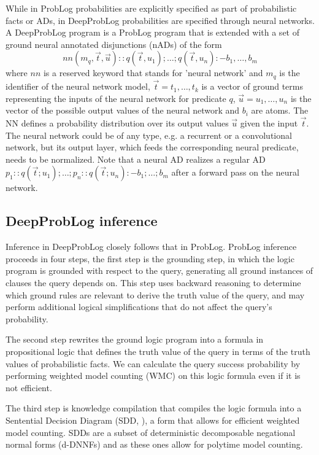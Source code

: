 While in ProbLog probabilities are explicitly specified as part of probabilistic facts or ADs, in DeepProbLog probabilities are specified through neural networks.
A DeepProbLog program is a ProbLog program that is extended with a set of ground neural annotated disjunctions (nADs) of the form
\begin{equation}
    nn(m_q, \vec{t}, \vec{u}) :: q(\vec{t}, u_1); \dots; q(\vec{t}, u_n) :- b_1, \dots, b_m
\end{equation}
where $nn$ is a reserved keyword that stands for 'neural network' and $m_q$ is the identifier of the neural network model, $\vec{t} = t_1, \dots, t_k$ is a vector of ground terms representing the inputs of the neural network for predicate $q$, $\vec{u} = u_1, \dots, u_n$ is the vector of the possible output values of the neural network and $b_i$ are atoms. The NN defines a probability distribution over its output values $\vec{u}$ given the input $\vec{t}$.
The neural network could be of any type, e.g. a recurrent or a convolutional network, but its output layer, which feeds the corresponding neural predicate, needs to be normalized.
Note that a neural AD realizes a regular AD $p_1 :: q(\vec{t}; u_1); \dots; p_n :: q(\vec{t}; u_n) :- b_1; \dots; b_m$ after a forward pass on the neural network.

\subsection{DeepProbLog inference}
Inference in DeepProbLog closely follows that in ProbLog. ProbLog inference proceeds in four steps, the first step is the grounding step, in which the logic program is grounded with respect to the query, generating all ground instances of clauses the query depends on. This step uses backward reasoning to determine which ground rules are relevant to derive the truth value of the query, and may perform additional logical simplifications that do not affect the query’s probability.

The second step rewrites the ground logic program into a formula in propositional logic that defines the truth value of the query in terms of the truth values of probabilistic facts. We can calculate the query success probability by performing weighted model counting (WMC) on this logic formula even if it is not efficient.

The third step is knowledge compilation that compiles the logic formula into a Sentential Decision Diagram (SDD, \cite{SDD_Darwiche}), a form that allows for efficient weighted model counting. SDDs are a subset of deterministic decomposable negational normal forms (d-DNNFs) and as these ones allow for polytime model counting.

